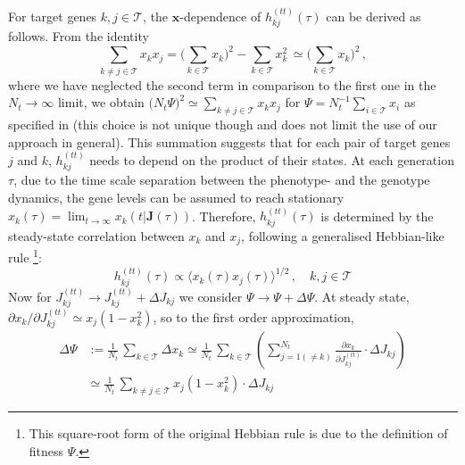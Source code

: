 \documentclass[%
 reprint,
superscriptaddress,
 amsmath,amssymb,
 prl,
]{revtex4-2}
\begin{document}
 For target genes $k,j\in \mathcal{T}$, the $\mathbf{x}$-dependence of  $h_{kj}^{(tt)} (\tau)$ can be derived as follows. From the identity
$$\sum_{k\neq j \in \mathcal{T}} x_k x_j  = \Big(\sum_{k\in \mathcal{T}} x_k\Big)^2 - \sum_{k \in \mathcal{T}} x_k^2\, \simeq \Big(\sum_{k\in \mathcal{T}} x_k\Big)^2 \,,$$
where we have neglected the second term  in comparison to the first one in the $N_t \rightarrow \infty$ limit, we obtain  $ \big(N_t \Psi)^2  \simeq \sum_{k\neq j \in \mathcal{T}} x_k x_j$ for  $\Psi = N_t^{-1}\sum_{i\in \mathcal{T}} x_i$ as specified in \cite{KanekoPloSOne2007} (this choice
is not unique though and does not limit the use of our approach in general). 
This summation suggests that for each pair of target genes $j$ and $k$, $h_{kj}^{(tt)}$  needs to depend on the product of their states. At each generation $\tau$,  due to the time scale separation between the phenotype- and the genotype dynamics, the gene levels can be assumed to reach stationary $x_k(\tau) = \lim_{t\rightarrow \infty} x_k(t|\mathbf{J}(\tau))$. Therefore, $  h_{kj}^{(tt)} (\tau)$ is determined by the steady-state correlation between $x_k$ and $x_j$, following a generalised Hebbian-like  rule \cite{hebb1949} \footnote{This square-root form of the original Hebbian rule is due to the definition of fitness $\Psi$.}:
  \begin{equation} 
  h_{kj}^{(tt)} (\tau) \propto \langle x_k(\tau) x_j(\tau) \rangle^{1/2}\,, \quad k,j\in \mathcal{T}
   \label{h_for_Jtt}
  \end{equation}
Now for   $J_{kj}^{(tt)} \rightarrow J_{kj}^{(tt)} +\Delta J_{kj}$ we consider $\Psi \rightarrow \Psi + \Delta \Psi$.  At  steady state, $\partial x_k / \partial J_{kj}^{(tt)} \simeq x_j(1- x_k^2) $, so to the first order approximation,
\begin{align} \nonumber
\Delta \Psi &:= \frac{1}{N_t}\, \sum_{k\in \mathcal{T}} \Delta x_k \simeq  \frac{1}{N_t}\, \sum_{k\in \mathcal{T}} \left(\sum_{j=1(\neq k)}^{N_t}\frac{\partial x_k}{\partial J_{kj}^{(tt)}} \cdot \Delta J_{kj}\right) \\ & \simeq  \frac{1}{N_t}\, \sum_{k\neq j \in \mathcal{T}}   x_j(1- x_k^2)\cdot \Delta J_{kj} \label{fitness_change}
\end{align}
\end{document}
